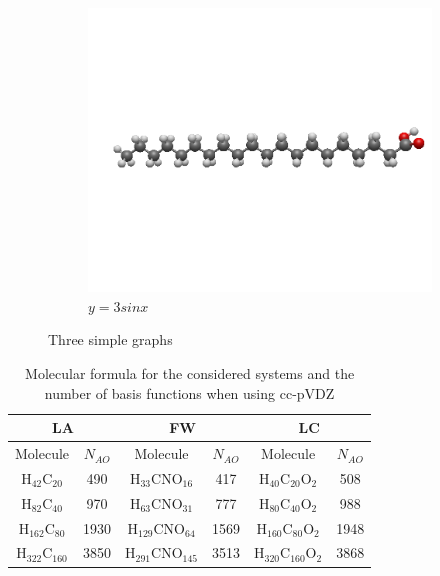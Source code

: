 \begin{figure}
     \hfill
     \begin{subfigure}{0.4\textwidth}
         \centering
         \includegraphics[width=\textwidth]{Pics/acid.png}
         \caption{$y=3sinx$}
         \label{fig:three sin x}
     \end{subfigure}
     \hfill
     
        \caption{Three simple graphs}
        \label{fig:three graphs}
\end{figure}

\begin{table}
\centering
\begin{tabular}{cc|cc|cc}
\hline
\multicolumn{2}{c}{LA} & \multicolumn{2}{c}{FW} & \multicolumn{2}{c}{LC}\\ \hline
Molecule & $N_{AO}$ & Molecule & $N_{AO}$ & Molecule & $N_{AO}$ \\ \hline
H$_{42}$C$_{20}$ & 490 & H$_{33}$CNO$_{16}$ & 417 & H$_{40}$C$_{20}$O$_2$ & 508 \\
H$_{82}$C$_{40}$ & 970 & H$_{63}$CNO$_{31}$ & 777 & H$_{80}$C$_{40}$O$_2$ & 988 \\
H$_{162}$C$_{80}$ & 1930 & H$_{129}$CNO$_{64}$ & 1569 & H$_{160}$C$_{80}$O$_2$ & 1948 \\
H$_{322}$C$_{160}$ & 3850 & H$_{291}$CNO$_{145}$ & 3513 & H$_{320}$C$_{160}$O$_2$ & 3868  
\end{tabular}
\label{MOLBASIS1}
\caption{Molecular formula for the considered systems and the number of basis functions when using cc-pVDZ}
\end{table}

